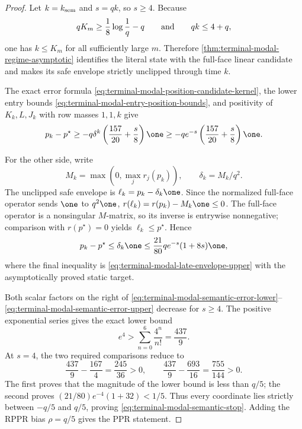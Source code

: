 \begin{proof}
Let $k=k_{\rm sem}$ and $s=qk$, so $s\ge4$.  Because
\[
 qK_m\ge\frac18\log\frac1q-q
 \qquad\hbox{and}\qquad
 qk\le4+q,
\]
one has $k\le K_m$ for all sufficiently large $m$.  Therefore
\cref{thm:terminal-modal-regime-asymptotic} identifies the literal state with
the full-face linear candidate and makes its safe envelope strictly
unclipped through time $k$.

The exact error formula
\eqref{eq:terminal-modal-position-candidate-kernel}, the lower entry bounds
\eqref{eq:terminal-modal-entry-position-bounds}, and positivity of $K_k,L,J_k$
with row masses $1,1,k$ give
\begin{equation}
 p_k-p^\star
 \ge-q\delta^k\left(\frac{157}{20}+\frac{s}{8}\right)\one
 \ge-qe^{-s}\left(\frac{157}{20}+\frac{s}{8}\right)\one.
 \label{eq:terminal-modal-semantic-error-lower}
\end{equation}

For the other side, write
\[
 M_k=\max(0,\max_j r_j(p_k)),
 \qquad
 \delta_k=M_k/q^2.
\]
The unclipped safe envelope is $\ell_k=p_k-\delta_k\one$.  Since the
normalized full-face operator sends $\one$ to $q^2\one$,
$r(\ell_k)=r(p_k)-M_k\one\le0$.  The full-face operator is a nonsingular
$M$-matrix, so its inverse is entrywise nonnegative; comparison with
$r(p^\star)=0$ yields $\ell_k\le p^\star$.  Hence
\begin{equation}
 p_k-p^\star\le\delta_k\one
 \le\frac{21}{80}qe^{-s}(1+8s)\one,
 \label{eq:terminal-modal-semantic-error-upper}
\end{equation}
where the final inequality is
\eqref{eq:terminal-modal-late-envelope-upper} with the asymptotically proved
static target.

Both scalar factors on the right of
\eqref{eq:terminal-modal-semantic-error-lower}--
\eqref{eq:terminal-modal-semantic-error-upper} decrease for $s\ge4$.
The positive exponential series gives the exact lower bound
\begin{equation}
 e^4>\sum_{n=0}^6\frac{4^n}{n!}=\frac{437}{9}.
 \label{eq:terminal-modal-semantic-exp-four}
\end{equation}
At $s=4$, the two required comparisons reduce to
\begin{equation}
 \frac{437}{9}-\frac{167}{4}=\frac{245}{36}>0,
 \qquad
 \frac{437}{9}-\frac{693}{16}=\frac{755}{144}>0.
 \label{eq:terminal-modal-semantic-rational-slacks}
\end{equation}
The first proves that the magnitude of the lower bound is less than $q/5$;
the second proves $(21/80)e^{-4}(1+32)<1/5$.  Thus every coordinate lies
strictly between $-q/5$ and $q/5$, proving
\eqref{eq:terminal-modal-semantic-stop}.  Adding the RPPR bias $\rho=q/5$
gives the PPR statement.
\end{proof}

